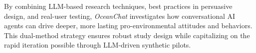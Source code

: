 By combining LLM-based research techniques, best practices in persuasive design, and real-user testing, \textit{OceanChat} investigates how conversational AI agents can drive deeper, more lasting pro-environmental attitudes and behaviors. This dual-method strategy ensures robust study design while capitalizing on the rapid iteration possible through LLM-driven synthetic pilots.